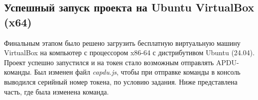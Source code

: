 \documentclass[12pt]{article}
\begin{document}
\subsection{Успешный запуск проекта на Ubuntu VirtualBox (x64)}
Финальным этапом было решено загрузить бесплатную виртуальную машину VirtualBox на компьютер с процессором x86-64 с дистрибутивом Ubuntu (24.04). \\
Проект успешно запустился и на токен стало возможным отправлять APDU-команды. Был изменен файл \emph{capdu.js}, чтобы при отправке команды в консоль выводился серийный номер токена, по условию задания. Ниже представлена часть, где была изменена команда.  


\end{document}
